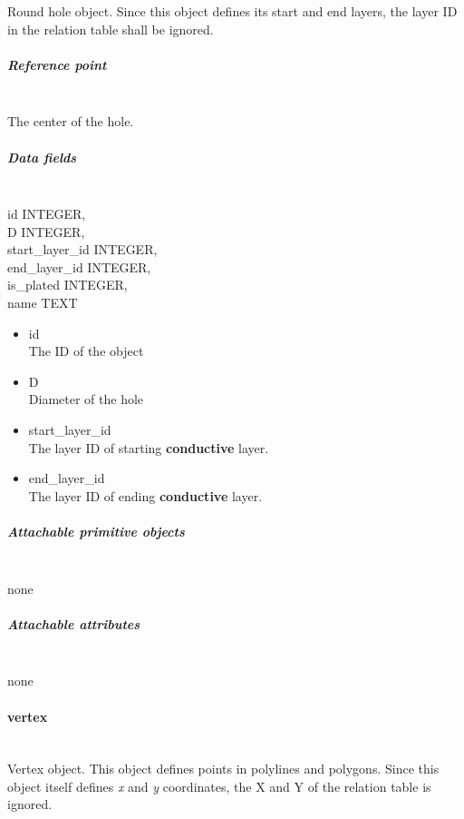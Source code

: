 \documentclass[12pt]{article}
\begin{document}
Round hole object. Since this object defines its start and end layers,
the layer ID in the relation table shall be ignored.

\subparagraph{Reference point}\label{reference-point-5}

\mbox{}\\

The center of the hole.

\subparagraph{Data fields}\label{data-fields-5}

\mbox{}\\

id INTEGER,\\
D INTEGER,\\
start\_layer\_id INTEGER,\\
end\_layer\_id INTEGER,\\
is\_plated INTEGER,\\
name TEXT

\begin{itemize}
\item
  id\\
The ID of the object
\item
  D\\
Diameter of the hole
\item
  start\_layer\_id\\
The layer ID of starting \textbf{conductive} layer.
\item
  end\_layer\_id\\
The layer ID of ending \textbf{conductive} layer.
\end{itemize}

\subparagraph{Attachable primitive
objects}\label{attachable-primitive-objects-5}

\mbox{}\\

none

\subparagraph{Attachable attributes}\label{attachable-attributes-5}

\mbox{}\\

none

\paragraph{vertex}\label{vertex}

\mbox{}\\

Vertex object. This object defines points in polylines and polygons.
Since this object itself defines \emph{x} and \emph{y} coordinates, the
X and Y of the relation table is ignored.
\end{document}
